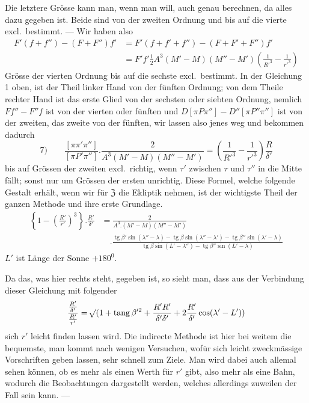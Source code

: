 Die letztere Grösse kann man, wenn man will, auch genau berechnen, da alles dazu gegeben ist. Beide sind von der zweiten Ordnung und bis auf die vierte excl.\ bestimmt. — Wir haben also
\[
\begin{aligned}
F'(f+f'')-(F+F'')f'&=F'(f+f'+f'')-(F+F'+F'')f'\\
&=F'f'\tfrac12A^3(M'-M)(M''-M')\left(\frac1{R'^3}-\frac1{r'^3}\right)
\end{aligned}
\]
Grösse der vierten Ordnung bis auf die sechste excl.\ bestimmt. In der Gleichung 1 oben, ist der Theil linker Hand von der fünften Ordnung; von dem Theile rechter Hand ist das erste Glied von der sechsten oder siebten Ordnung, nemlich $Ff''-F''f$ ist von der vierten oder fünften und $D[\pi P\pi'']-D''[\pi P''\pi'']$ ist von der zweiten, das zweite von der fünften, wir lassen also jenes weg und bekommen dadurch
\[
7)\qquad\frac{[\pi\pi'\pi'']}{[\pi P'\pi'']}.\frac2{A^3(M'-M)(M''-M')}=\left(\frac1{R'^3}-\frac1{r'^3}\right)\frac R{\delta'}
\]
%
bis auf Grössen der zweiten excl.\ richtig, wenn $\tau'$ zwischen $\tau$ und $\tau''$ in die Mitte fällt; sonst nur um Grössen der ersten unrichtig. Diese Formel, welche folgende Gestalt erhält, wenn wir für $\mathfrak{Z}$ die Ekliptik nehmen, ist der wichtigste Theil der ganzen Methode und ihre erste Grundlage.
\[
\begin{aligned}
\left\{1-\left(\frac{R'}{r'}\right)^3\right\}.\frac{R'}{\delta'}&=\frac2{A^3.(M'-M)(M''-M')}\\
&\quad.\frac{\operatorname{tg}\beta'\sin(\lambda''-\lambda)-\operatorname{tg}\beta\sin(\lambda''-\lambda')-\operatorname{tg}\beta''\sin(\lambda'-\lambda)}{\operatorname{tg}\beta\sin(L'-\lambda'')-\operatorname{tg}\beta''\sin(L'-\lambda)}
\end{aligned}
\]
$L'$ ist Länge der Sonne $+180^0$.

Da das, was hier rechts steht, gegeben ist, so sieht man, dass aus der Verbindung dieser Gleichung mit folgender
\[
\frac{\frac{R'}{\delta'}}{\frac{R'}{r'}}=\mathord{{}^{}\!\surd}(1+\operatorname{tang}\beta'^2+\frac{R'R'}{\delta'\delta'}+2\frac{R'}{\delta'}\cos(\lambda'-L'))
\]
sich $r'$ leicht finden lassen wird. Die indirecte Methode ist hier bei weitem die bequemste, man kommt nach wenigen Versuchen, wofür sich leicht zweckmässige Vorschriften geben lassen, sehr schnell zum Ziele. Man wird dabei auch allemal sehen können, ob es mehr als einen Werth für $r'$ gibt, also mehr als eine Bahn, wodurch die Beobachtungen dargestellt werden, welches allerdings zuweilen der Fall sein kann. —

